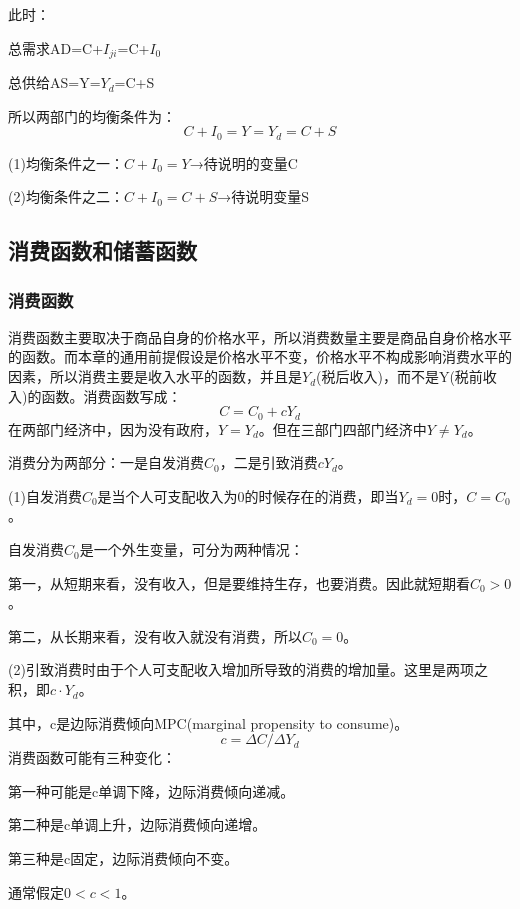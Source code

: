 \documentclass{article}
\begin{document}
此时：

总需求AD=C+$ I_{ji} $=C+$ I_0 $

总供给AS=Y=$ Y_d $=C+S

所以两部门的均衡条件为：
\[
C+I_0=Y=Y_d=C+S
\]

\hspace*{\fill}

(1)均衡条件之一：$ C+I_0=Y $→待说明的变量C

(2)均衡条件之二：$ C+I_0=C+S $→待说明变量S

\subsection{消费函数和储蓄函数}
\subsubsection{消费函数}
消费函数主要取决于商品自身的价格水平，所以消费数量主要是商品自身价格水平的函数。而本章的通用前提假设是价格水平不变，价格水平不构成影响消费水平的因素，所以消费主要是收入水平的函数，并且是$ Y_d $(税后收入)，而不是Y(税前收入)的函数。消费函数写成：
\[
C=C_0+cY_d
\]
在两部门经济中，因为没有政府，$ Y=Y_d $。但在三部门四部门经济中$ Y\ne Y_d $。

消费分为两部分：一是自发消费$ C_0 $，二是引致消费$ cY_d $。

\hspace*{\fill}

(1)自发消费$ C_0 $是当个人可支配收入为0的时候存在的消费，即当$ Y_d=0 $时，$ C=C_0 $。

自发消费$ C_0 $是一个外生变量，可分为两种情况：

第一，从短期来看，没有收入，但是要维持生存，也要消费。因此就短期看$ C_0>0 $。

第二，从长期来看，没有收入就没有消费，所以$ C_0=0 $。

\hspace*{\fill}

(2)引致消费时由于个人可支配收入增加所导致的消费的增加量。这里是两项之积，即$ c\cdot Y_d $。

其中，c是边际消费倾向MPC(marginal propensity to consume)。
\[
c=\Delta C/\Delta Y_d
\]
消费函数可能有三种变化：

第一种可能是c单调下降，边际消费倾向递减。

第二种是c单调上升，边际消费倾向递增。

第三种是c固定，边际消费倾向不变。

通常假定$ 0<c<1 $。
\end{document}
